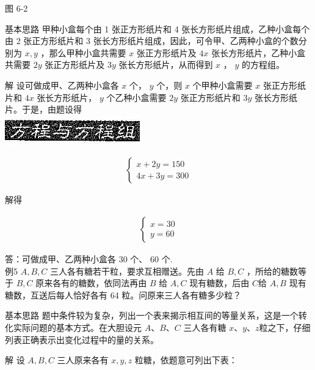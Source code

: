 \documentclass[10pt]{article}
\begin{document}
图 6-2

基本思路 甲种小盒每个由 1 张正方形纸片和 4 张长方形纸片组成，乙种小盒每个由 2 张正方形纸片和 3 张长方形纸片组成，因此，可令甲、乙两种小盒的个数分别为 $x, y$ ，那么甲种小盒共需要 $x$ 张正方形纸片及 $4 x$ 张长方形纸片，乙种小盒共需要 $2 y$ 张正方形纸片及 $3 y$ 张长方形纸片，从而得到 $x$ ， $y$ 的方程组。

解 设可做成甲、乙两种小盒各 $x$ 个， $y$ 个，则 $x$ 个甲种小盒需要 $x$ 张正方形纸片和 $4 x$ 张长方形纸片， $y$ 个乙种小盒需要 $2 y$ 张正方形纸片和 $3 y$ 张长方形纸片。于是，由题设得\\
\includegraphics[max width=\textwidth, center]{2024_10_30_26b590fd1106d28139f0g-034(3)}

\begin{align*}
\left\{\begin{array}{l}
x+2 y=150 \\
4 x+3 y=300
\end{array}\right.
\end{align*}

解得

\begin{align*}
\left\{\begin{array}{l}
x=30 \\
y=60
\end{array}\right.
\end{align*}

答：可做成甲、乙两种小盒各 30 个、 60 个.\\
例5 $A, B, C$ 三人各有糖若干粒，要求互相赠送。先由 $A$ 给 $B, C$ ，所给的糖数等于 $B, C$ 原来各有的糖数，依同法再由 $B$ 给 $A, C$ 现有糖数，后由 $C$给 $A, B$ 现有糖数，互送后每人恰好各有 64 粒。问原来三人各有糖多少粒？

基本思路 题中条件较为复杂，列出一个表来揭示相互间的等量关系，这是一个转化实际问题的基本方式。在大胆设元 $A 、 B 、 C$ 三人各有糖 $x 、 y 、 z$粒之下，仔细列表正确表示出变化过程中的量的关系。

解 设 $A, B, C$ 三人原来各有 $x, y, z$ 粒糖，依题意可列出下表：
\end{document}
